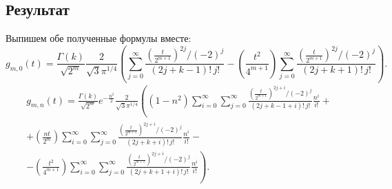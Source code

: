 \documentclass[../../paper.tex]{subfiles}
\begin{document}
\subsection{Результат}
Выпишем обе полученные формулы вместе:
\[
    g_{m,0}(t) =
%
    \frac{\Gamma(k)}{\sqrt{2^m}}
    \frac{2}{\sqrt{3} \pi^{1/4}} \left(
%
    \sum_{j=0}^{\infty} \frac{\left(\frac{t}{2^{m+1}}\right)^{2j} / (-2)^j}{(2j+k-1)!\,j!}
-
    \left( \frac{t^2}{4^{m+1}} \right) 
    \sum_{j=0}^{\infty} \frac{\left(\frac{t}{2^{m+1}}\right)^{2j} / (-2)^j}{(2j+k+1)!\,j!}
%
    \right)
.\]
\begin{multline*}
    g_{m,n}(t)
=
    \frac{\Gamma(k)}{\sqrt{2^m}} e^{-\frac{n^2}{2}} \frac{2}{\sqrt{3} \pi^{1/4}} \left(
    \left( 1-n^2 \right) 
    \sum_{i=0}^{\infty} \sum_{j=0}^{\infty} \frac{\left( \frac{t}{2^{m+1}} \right) ^{2j+i} / (-2)^j}{(2j+k-1+i)!\,j!} \frac{n^i}{i!}
\right. +\\+
    \left( \frac{nt}{2^m} \right) 
    \sum_{i=0}^{\infty} \sum_{j=0}^{\infty} \frac{\left( \frac{t}{2^{m+1}} \right) ^{2j+i} / (-2)^j}{(2j+k+i)!\,j!} \frac{n^i}{i!}
-\\- \left.
    \left( \frac{t^2}{4^{m+1}} \right) 
    \sum_{i=0}^{\infty} \sum_{j=0}^{\infty} \frac{\left( \frac{t}{2^{m+1}} \right) ^{2j+i} / (-2)^j}{(2j+k+1+i)!\,j!} \frac{n^i}{i!}
    \right)
.\end{multline*}
%
\end{document}
